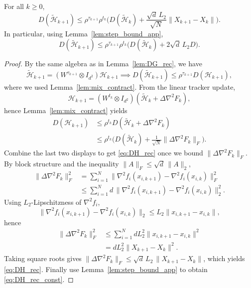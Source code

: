 \documentclass[review,onefignum,onetabnum]{siamart171218}
\begin{document}
\begin{lemma}\label{lem:DH_rec}
For all $k\ge0$,
\begin{equation}\label{eq:DH_rec}
D(\tilde{\mathcal H}_{k+1})
\le \rho^{\tau_{k+1}}\rho^{t_k}\Big(D(\tilde{\mathcal H}_k)+\frac{\sqrt d\,L_2}{\sqrt N}\|X_{k+1}-X_k\|\Big).
\end{equation}
In particular, using Lemma~\ref{lem:step_bound_app},
\begin{equation}\label{eq:DH_rec_const}
D(\tilde{\mathcal H}_{k+1})
\le \rho^{\tau_{k+1}}\rho^{t_k}\Big(D(\tilde{\mathcal H}_k)+2\sqrt d\,L_2D\Big).
\end{equation}
\end{lemma}
\begin{proof}
By the same algebra as in Lemma~\ref{lem:DG_rec}, we have
\[
\tilde{\mathcal H}_{k+1} = (W^{\tau_{k+1}}\!\otimes\! I_{d^2})\mathcal H_{k+1} \implies
D(\tilde{\mathcal H}_{k+1}) \le \rho^{\tau_{k+1}} D(\mathcal H_{k+1}),
\]
where we used Lemma~\ref{lem:mix_contract}. From the linear tracker update,
\[
\mathcal H_{k+1} = (W^{t_k}\!\otimes\! I_{d^2})(\tilde{\mathcal H}_k\!+\!\Delta\nabla^2 F_k),
\]
hence Lemma~\ref{lem:mix_contract} yields
\begin{align*}
D(\mathcal H_{k+1})
&\le \rho^{t_k}D(\tilde{\mathcal H}_k\!+\!\Delta\nabla^2 F_k)\\
&\le \rho^{t_k}\!\Big(D(\tilde{\mathcal H}_k)\!+\!\tfrac1{\sqrt N}\|\Delta\nabla^2 F_k\|_F\Big).
\end{align*}
Combine the last two displays to get \eqref{eq:DH_rec} once we bound $\|\Delta\nabla^2F_k\|_F$.
By block structure and the inequality $\|A\|_F\le \sqrt d\,\|A\|_2$,
\begin{align*}
\|\Delta\nabla^2 F_k\|_F^2
&=\textstyle\sum_{i=1}^N\|\nabla^2 f_i(x_{i,k+1})\!-\!\nabla^2 f_i(x_{i,k})\|_F^2\\
&\le \textstyle\sum_{i=1}^N d\,\|\nabla^2 f_i(x_{i,k+1})\!-\!\nabla^2 f_i(x_{i,k})\|_2^2.
\end{align*}
Using $L_2$-Lipschitzness of $\nabla^2 f_i$,
\[
\|\nabla^2 f_i(x_{i,k+1})\!-\!\nabla^2 f_i(x_{i,k})\|_2\le L_2\|x_{i,k+1}\!-\!x_{i,k}\|,
\]
hence
\begin{align*}
\|\Delta\nabla^2 F_k\|_F^2
&\le \textstyle\sum_{i=1}^N d L_2^2\|x_{i,k+1}\!-\!x_{i,k}\|^2\\
&= dL_2^2\|X_{k+1}\!-\!X_k\|^2.
\end{align*}
Taking square roots gives $\|\Delta\nabla^2 F_k\|_F\le \sqrt d\,L_2\,\|X_{k+1}-X_k\|$,
which yields \eqref{eq:DH_rec}. Finally use Lemma~\ref{lem:step_bound_app} to obtain \eqref{eq:DH_rec_const}.
\end{proof}
\end{document}
